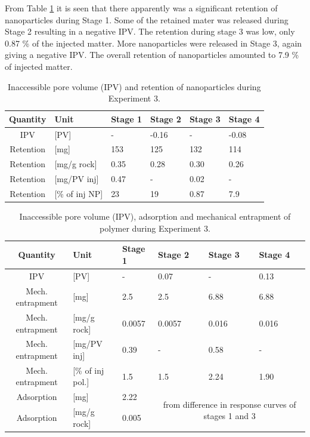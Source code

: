 From Table  \ref{tab:ipvexp3} it is seen that there apparently was a significant retention of nanoparticles during Stage 1. Some of the retained mater was released during Stage 2 resulting in a negative IPV. The retention during stage 3 was low, only 0.87 \% of the injected matter. More nanoparticles were released in Stage 3, again giving a negative IPV. The overall retention of nanoparticles amounted to 7.9 \% of injected matter.

\begin{table} 
\small
\centering
\caption{Inaccessible pore volume (IPV) and retention of nanoparticles during Experiment 3.}
\label{tab:ipvexp3}
\begin{tabular}{c l l l l l } 
\toprule
\textbf{Quantity} & \textbf{Unit} & \textbf{Stage 1} & \textbf{Stage 2} & \textbf{Stage 3} & \textbf{Stage 4} \\ 
\midrule 
IPV         & [PV]          & -         & -0.16     & -         & -0.08     \\
Retention   & [mg]          & 153       & 125       & 132       & 114       \\ 
Retention   & [mg/g rock]   & 0.35      & 0.28     & 0.30     & 0.26     \\ 
Retention   & [mg/PV inj]   & 0.47      & -         & 0.02      & -         \\
Retention   & [\% of inj NP]& 23        & 19       & 0.87       & 7.9       \\ 
\bottomrule
\end{tabular}
\end{table}

\begin{table}[h!]
\small
\centering
\caption{Inaccessible pore volume (IPV), adsorption and mechanical entrapment of polymer during Experiment 3.}
\label{tab:ipvexp3pol}
\begin{tabular}{c l l l l l } 
\toprule
\textbf{Quantity} & \textbf{Unit} & \textbf{Stage 1} & \textbf{Stage 2} & \textbf{Stage 3} & \textbf{Stage 4} \\ 
\midrule 
IPV                & [PV]           & -         & 0.07     & -         & 0.13     \\
Mech. entrapment   & [mg]          & 2.5       & 2.5      & 6.88       & 6.88       \\ 
Mech. entrapment   & [mg/g rock]   & 0.0057   & 0.0057     & 0.016     & 0.016     \\ 
Mech. entrapment   & [mg/PV inj]   & 0.39      & -         & 0.58      & -         \\
Mech. entrapment   & [\% of inj pol.]& 1.5       & 1.5       & 2.24       & 1.90       \\ 
Adsorption         & [mg]          & 2.22      &   \multicolumn{3}{c}{\multirow{2}{15em}{from difference in response curves of stages 1 and 3}}        \\
Adsorption         & [mg/g rock]   & 0.005      &  \multicolumn{3}{c}{}    \\ 
\bottomrule
\end{tabular}
\end{table}

